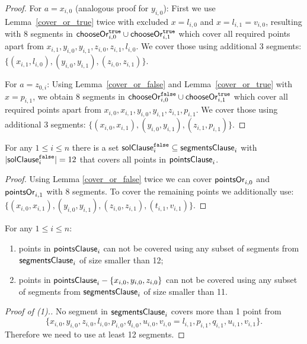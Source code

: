 \begin{proof}
For $a = x_{i, 0}$ (analogous proof for $y_{i, 0}$):
First we use Lemma~\ref{cover_or_true} twice with excluded $x = l_{i, 0}$ and
$x = l_{i, 1} = v_{i, 0}$,
resulting with 8 segments in $\mathsf{chooseOr}^{\texttt{true}}_{i,0} \cup \mathsf{chooseOr}^{\texttt{true}}_{i,1}$
which cover all required points apart from
$x_{i, 1}, y_{i, 0}, y_{i, 1}, z_{i, 0}, z_{i, 1}, l_{i, 0}$.
We cover those using additional 3 segments:
$\{ (x_{i, 1}, l_{i, 0}), (y_{i, 0}, y_{i, 1}),
(z_{i, 0}, z_{i, 1}) \}$.

For $a = z_{0, i}$:
Using Lemma~\ref{cover_or_false} and Lemma~\ref{cover_or_true} with
$x = p_{i, 1}$,
we obtain 8 segments in $\mathsf{chooseOr}^{\texttt{false}}_{i,0} \cup \mathsf{chooseOr}^{\texttt{true}}_{i,1}$
which cover all required points apart from
$x_{i, 0}, x_{i, 1}, y_{i, 0}, y_{i, 1}, z_{i, 1}, p_{i, 1}$.
We cover those using additional 3 segments:
$\{ (x_{i, 0}, x_{i, 1}), (y_{i, 0}, y_{i, 1}),
(z_{i, 1}, p_{i, 1}) \}$.
\end{proof}

\begin{lemma}
\label{cover_clauses_solution_false}
For any $1 \le i \le n$ there is
a set $\mathsf{solClause}^{\texttt{false}}_i \subseteq \mathsf{segmentsClause}_i$
with $|\mathsf{solClause}^{\texttt{false}}_i| = 12$
that covers all points in $\mathsf{pointsClause}_{i}$.
\end{lemma}

\begin{proof}
Using Lemma \ref{cover_or_false} twice we can
cover $\mathsf{pointsOr}_{i,0}$ and  $\mathsf{pointsOr}_{i,1}$
with 8 segments.
To cover the remaining points we additionally use:
$\{ (x_{i, 0}, x_{i, 1}), (y_{i, 0}, y_{i, 1}),
(z_{i, 0}, z_{i, 1}), (t_{i, 1}, v_{i, 1}) \}.$
\end{proof}

\begin{lemma}
\label{cover_clauses_segments_no_less}
For any $1 \le i \le n$:
\begin{enumerate}[label={(\arabic*)}]
	\item points in $\mathsf{pointsClause}_{i}$ can not be covered 
	using any subset of segments
	from $\mathsf{segmentsClause}_i$ of size smaller than 12;
	\item points in $\mathsf{pointsClause}_{i} - \{ x_{i, 0}, y_{i, 0}, z_{i, 0}\}$
	can not be covered using any subset of segments
	from $\mathsf{segmentsClause}_i$ of size smaller than 11.
\end{enumerate}
\end{lemma}


\begin{proof}[Proof of (1).]
No segment in $\mathsf{segmentsClause}_i$ covers more than 1 point from
$$\{ x_{i, 0}, y_{i, 0}, z_{i, 0}, l_{i, 0}, p_{i, 0}, q_{i, 0},
u_{i, 0}, v_{i, 0} = l_{i, 1}, p_{i, 1}, q_{i, 1}, u_{i, 1}, v_{i, 1} \}.$$
Therefore we need to use at least 12 segments.
\end{proof}

